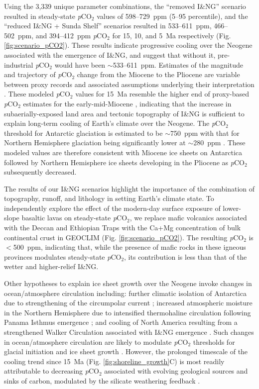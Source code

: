 \documentclass[11pt,letterpaper]{article}
\newcommand{\pCOtwo}{\textit{p}CO$_{2}$\xspace}
\begin{document}
Using the 3,339 unique parameter combinations, the ``removed I\&NG'' scenario resulted in steady-state \pCOtwo values of 598--729~ppm (5--95 percentile), and the ``reduced I\&NG + Sunda Shelf'' scenarios resulted in 533--611~ppm, 466--502~ppm, and 394--412~ppm \pCOtwo for 15, 10, and 5~Ma respectively (Fig. \ref{fig:scenario_pCO2}). These results indicate progressive cooling over the Neogene associated with the emergence of I\&NG, and suggest that without it, pre-industrial \pCOtwo would have been $\sim$533--611~ppm. Estimates of the magnitude and trajectory of \pCOtwo change from the Miocene to the Pliocene are variable between proxy records and associated assumptions underlying their interpretation \cite{Foster2017a, Mejia2017a}. These modeled \pCOtwo values for 15~Ma resemble the higher end of proxy-based \pCOtwo estimates for the early-mid-Miocene \cite{Foster2017a}, indicating that the increase in subaerially-exposed land area and tectonic topography of I\&NG is sufficient to explain long-term cooling of Earth's climate over the Neogene. The \pCOtwo threshold for Antarctic glaciation is estimated to be $\sim$750~ppm with that for Northern Hemisphere glaciation being significantly lower at $\sim$280~ppm \cite{DeConto2008a}. These modeled values are therefore consistent with Miocene ice sheets on Antarctica followed by Northern Hemisphere ice sheets developing in the Pliocene as \pCOtwo subsequently decreased.

The results of our I\&NG scenarios highlight the importance of the combination of topography, runoff, and lithology in setting Earth’s climate state. To independently explore the effect of the modern-day surface exposure of lower-slope basaltic lavas on steady-state \pCOtwo \cite{Kent2008a, Kent2013a}, we replace mafic volcanics associated with the Deccan and Ethiopian Traps with the Ca+Mg concentration of bulk continental crust in GEOCLIM (Fig. \ref{fig:scenario_pCO2}). The resulting \pCOtwo is $<$500~ppm, indicating that, while the presence of mafic rocks in these igneous provinces modulates steady-state \pCOtwo, its contribution is less than that of the wetter and higher-relief I\&NG.

Other hypotheses to explain ice sheet growth over the Neogene invoke changes in ocean/atmosphere circulation including: further climatic isolation of Antarctica due to strengthening of the circumpolar current \cite{Shevenell2004a}; increased atmospheric moisture in the Northern Hemisphere due to intensified thermohaline circulation following Panama Isthmus emergence \cite{Haug1998a}; and cooling of North America resulting from a strengthened Walker Circulation associated with I\&NG emergence \cite{Molnar2015a}. Such changes in ocean/atmosphere circulation are likely to modulate \pCOtwo thresholds for glacial initiation and ice sheet growth \cite{DeConto2008a}. However, the prolonged timescale of the cooling trend since 15~Ma (Fig. \ref{fig:shoreline_growth}C) is most readily attributable to decreasing \pCOtwo associated with evolving geological sources and sinks of carbon, modulated by the silicate weathering feedback \cite{Walker1981a, Raymo1991a, Berner1997a, Kump1997a, Berner2001a}.
\end{document}
